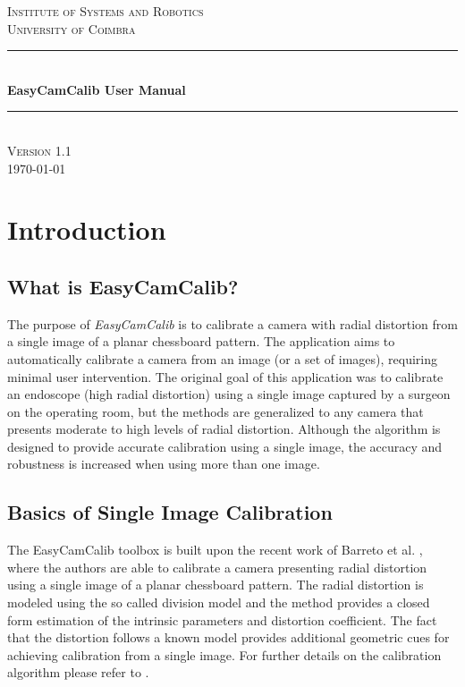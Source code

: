 \documentclass[article,11pt]{memoir}
\newcommand{\HRule}{\rule{\linewidth}{0.5mm}}
\begin{document}
\title{}
\date{}
\author{}
\maketitle
\begin{center}
\textsc{\Large Institute of Systems and Robotics}\\[0.5cm]
\textsc{University of Coimbra}\\[0.5cm]
\HRule \\[1cm]
{ \huge \bfseries EasyCamCalib User Manual
}\\[0.4cm]
\HRule \\[2cm]
\textsc{\Large Version 1.1}\\[0.5cm]
\vfill
{\large \today}
\end{center}

\pagestyle{ruled}


\newpage
\tableofcontents
\newpage
\chapter{Introduction}
\section{What is EasyCamCalib?}
\label{sec:whatis}
The purpose of \textit{EasyCamCalib} is to calibrate a camera with radial distortion from a single image of a planar chessboard pattern. The application aims to automatically calibrate a camera from an image (or a set of images), requiring minimal user intervention. The original goal of this application was to calibrate an endoscope (high radial distortion) using a single image captured by a surgeon on the operating room, but the methods are generalized to any camera that presents moderate to high levels of radial distortion. Although the algorithm is designed to provide accurate calibration using a single image, the accuracy and robustness is increased when using more than one image.


\section{Basics of Single Image Calibration}
\label{sec:calibfromasingelimage}
The EasyCamCalib toolbox is built upon the recent work of Barreto et al. \cite{barreto_09}, where the authors are able to calibrate a camera presenting radial distortion using a single image of a planar chessboard pattern. The radial distortion is modeled using the so called division model \cite{divmodel} and the method provides a closed form estimation of the intrinsic parameters and distortion coefficient. The fact that the distortion follows a known model provides additional geometric cues for achieving calibration from a single image. For further details on the calibration algorithm please refer to \cite{barreto_09}.
\end{document}
